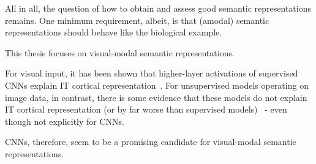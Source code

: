 All in all, the question of how to obtain and assess good semantic representations remains.
One minimum requirement, albeit, is that (amodal) semantic representations should behave like the biological example.

This thesis focuses on visual-modal semantic representations.

For visual input, it has been shown that higher-layer activations of supervised \acp{CNN} explain \ac{IT} cortical representation~\citep{khaligh2014deep,cadieu2014deep}.
For unsupervised models operating on image data, in contrast, there is some evidence that these models do not explain \ac{IT} cortical representation (or by far worse than supervised models)~\citep{khaligh2014deep} - even though not explicitly for \acp{CNN}.

\acp{CNN}, therefore, seem to be a promising candidate for visual-modal semantic representations.

